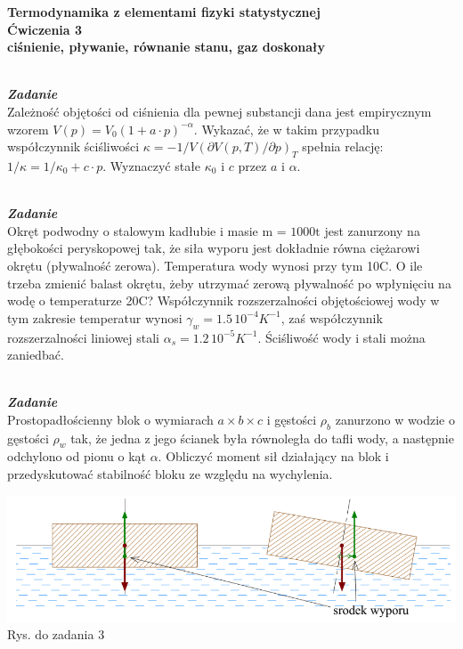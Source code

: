 \documentclass[11pt,a4paper]{article}
\newcounter{zadanie}\newcommand{\zadanie}[1][]{\addtocounter{zadanie}{1} ~\\  {\bf \emph{Zadanie \arabic{zadanie} #1 }} \\}
\begin{document}
\vspace*{-1.8cm}

\begin{centering}
\bf{\Large{Termodynamika z elementami fizyki statystycznej}}\\
Ćwiczenia 3 \\[1mm]
ciśnienie, pływanie, równanie stanu, gaz doskonały \\
\end{centering}

\zadanie
Zależność objętości od ciśnienia dla pewnej substancji dana jest empirycznym wzorem $V(p) = V_0(1 + a\cdot p)^{-\alpha}$.
Wykazać, że w takim przypadku współczynnik ściśliwości $\kappa=-1/V(\partial V(p,T)/\partial p)_T$ spełnia relację: $1/\kappa=1/\kappa_0+c\cdot p$.
Wyznaczyć stałe $\kappa_0$ i $c$ przez $a$ i $\alpha$.

\zadanie
Okręt podwodny o stalowym kadłubie i masie m = $1000\textrm{t}$ jest zanurzony na głębokości peryskopowej tak, że siła wyporu jest dokładnie równa ciężarowi okrętu (pływalność zerowa). Temperatura wody wynosi przy tym 10\degree C. O ile trzeba zmienić balast okrętu, żeby utrzymać zerową pływalność po wpłynięciu na wodę o temperaturze 20\degree C? Współczynnik rozszerzalności objętościowej wody w tym zakresie temperatur wynosi $\gamma_w = 1.5\,10^{-4} K^{-1}$, zaś współczynnik rozszerzalności liniowej stali $\alpha_s = 1.2\,10^{-5} K^{-1}$. Ściśliwość wody i stali można zaniedbać.


\begin{minipage}{0.65\textwidth}
\zadanie
Prostopadłościenny blok o wymiarach $a\times b\times c$ i gęstości $\rho_b$ zanurzono w wodzie o gęstości $\rho_w$ tak, że jedna z jego ścianek była równoległa do tafli wody, a następnie odchylono od pionu o kąt $\alpha$. Obliczyć moment sił działający na blok i przedyskutować stabilność bloku ze względu na wychylenia. 
\end{minipage}
\begin{minipage}{0.35\textwidth}
\begin{center}
\includegraphics[width=1.0\textwidth]{plywanie3.png}\\
Rys. do zadania 3
\end{center}
\end{minipage}
\end{document}
